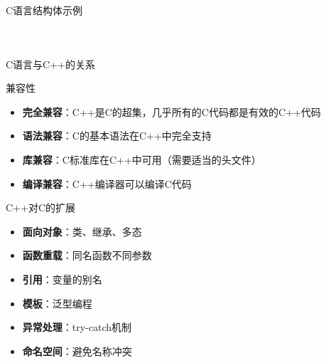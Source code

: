 \documentclass[UTF8,aspectratio=169]{beamer}
\begin{document}
\begin{frame}[fragile]{C语言结构体示例}
    \begin{columns}
        \begin{column}{0.48\textwidth}
            \inputminted[firstline=1,lastline=14]{cpp}{code/c_struct_example.c}
        \end{column}
        \begin{column}{0.48\textwidth}
            \inputminted[firstline=15,lastline=28]{cpp}{code/c_struct_example.c}
        \end{column}
    \end{columns}
\end{frame}

\begin{frame}{C语言与C++的关系}
    \begin{ytublock}{兼容性}
        \begin{itemize}
            \item \textbf{完全兼容}：C++是C的超集，几乎所有的C代码都是有效的C++代码
            \item \textbf{语法兼容}：C的基本语法在C++中完全支持
            \item \textbf{库兼容}：C标准库在C++中可用（需要适当的头文件）
            \item \textbf{编译兼容}：C++编译器可以编译C代码
        \end{itemize}
    \end{ytublock}

    \begin{ytublock}{C++对C的扩展}
        \begin{itemize}
            \item \textbf{面向对象}：类、继承、多态
            \item \textbf{函数重载}：同名函数不同参数
            \item \textbf{引用}：变量的别名
            \item \textbf{模板}：泛型编程
            \item \textbf{异常处理}：try-catch机制
            \item \textbf{命名空间}：避免名称冲突
        \end{itemize}
    \end{ytublock}
\end{frame}
\end{document}
